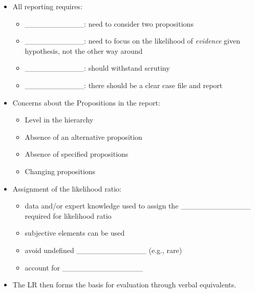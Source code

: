 \documentclass[]{book}
\providecommand{\tightlist}{%
  \setlength{\itemsep}{0pt}\setlength{\parskip}{0pt}}
\theoremstyle{definition}
\theoremstyle{definition}
\theoremstyle{remark}
\begin{document}
\begin{itemize}
\tightlist
\item
  All reporting requires:

  \begin{itemize}
  \tightlist
  \item
    \_\_\_\_\_\_\_\_\_\_\_: need to consider two propositions
    \vspace{.1in}
  \item
    \_\_\_\_\_\_\_\_\_\_\_: need to focus on the likelihood of
    \emph{evidence} given hypothesis, not the other way around
    \vspace{.1in}
  \item
    \_\_\_\_\_\_\_\_\_\_\_: should withstand scrutiny \vspace{.1in}
  \item
    \_\_\_\_\_\_\_\_\_\_\_: there should be a clear case file and report
  \end{itemize}
\item
  Concerns about the Propositions in the report:

  \begin{itemize}
  \tightlist
  \item
    Level in the hierarchy
  \item
    Absence of an alternative proposition
  \item
    Absence of specified propositions
  \item
    Changing propositions
  \end{itemize}
\item
  Assignment of the likelihood ratio:

  \begin{itemize}
  \tightlist
  \item
    data and/or expert knowledge used to assign the
    \_\_\_\_\_\_\_\_\_\_\_\_\_ required for likelihood ratio
    \vspace{.1in}
  \item
    subjective elements can be used \vspace{.1in}
  \item
    avoid undefined \_\_\_\_\_\_\_\_\_\_\_\_\_ (e.g., rare)
    \vspace{.1in}
  \item
    account for \_\_\_\_\_\_\_\_\_\_\_\_\_\_\_
  \end{itemize}
\item
  The LR then forms the basis for evaluation through verbal equivalents.
\end{itemize}
\end{document}
